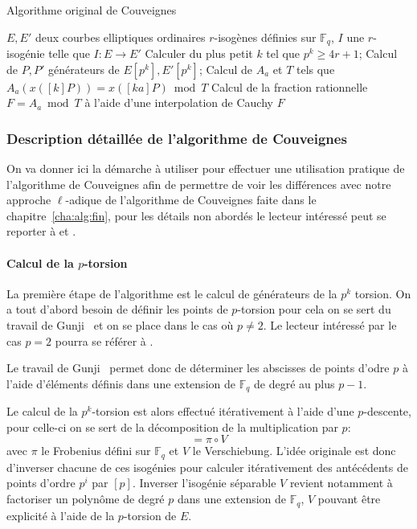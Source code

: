 \documentclass[10pt,a4paper]{book}
\theoremstyle{plain}
\theoremstyle{definition}
\theoremstyle{definition}
\theoremstyle{definition}
\theoremstyle{definition}
\theoremstyle{definition}
\theoremstyle{remark}
\theoremstyle{remark}
\theoremstyle{definition}
\begin{document}
\begin{algorithm}
\caption{\label{alg:orig:Couv} Algorithme original de Couveignes}
\begin{algorithmic}[1]
\REQUIRE $E,E'$ deux courbes elliptiques ordinaires $r$-isogènes définies sur $\mathbb{F}_q$,%
\ENSURE $I$ une $r$-isogénie telle que $I:E \rightarrow E'$
\STATE Calculer du plus petit $k$ tel que $p^k \geqslant 4r+1$;
\STATE Calcul de $P,P'$ générateurs de $E[p^k],E'[p^k]$;
\STATE Calcul de $A_a$ et $T$ tels que $A_a(x([k]P))=x([ka]P) \bmod T$
\STATE Calcul de la fraction rationnelle $F=A_a \bmod T$ à l'aide d'une 
interpolation de Cauchy
\RETURN $F$
\ENDIF
\ENDFOR
\end{algorithmic}
\end{algorithm}

\subsubsection{Description détaillée de l'algorithme de Couveignes }
On va donner ici la démarche à utiliser pour effectuer une utilisation 
pratique de l'algorithme de Couveignes afin de permettre de voir les différences
avec notre approche $\ell$-adique de l'algorithme de Couveignes faite dans le
chapitre~\ref{cha:alg:fin}, pour les détails non abordés le lecteur intéressé 
peut se reporter à \cite{Couveignes96} et \cite{DeFeo11}.

\paragraph{Calcul de la $p$-torsion}
La première étape de l'algorithme est le calcul de générateurs de la $p^k$ 
torsion. On a tout d'abord besoin de définir les points de $p$-torsion pour 
cela on se sert du travail de Gunji~\cite{Gunji76} et on se place dans le cas 
où $p \neq 2$. Le lecteur intéressé par le cas $p=2$ pourra se référer à 
\cite[§3.2]{DeFeo11}.

Le travail de Gunji~\cite[Theorem 4]{Gunji76} permet donc de déterminer les 
abscisses de points d'odre $p$ à l'aide d'éléments définis dans une extension 
de $\mathbb{F}_q$ de degré au plus $p-1$.  

Le calcul de la $p^k$-torsion est alors effectué itérativement à l'aide d'une 
$p$-descente, pour celle-ci on se sert de la décomposition de la multiplication
par $p$: 
\begin{equation}
[p]=\pi \circ V
\end{equation}
avec $\pi$ le Frobenius défini sur $\mathbb{F}_q$ et $V$ le Verschiebung. 
L'idée originale est donc d'inverser chacune  de ces isogénies pour calculer 
itérativement des antécédents de points d'ordre $p^i$ par $[p]$. Inverser 
l'isogénie séparable $V$ revient notamment à factoriser un polynôme de degré 
$p$ dans une extension de $\mathbb{F}_q$, $V$ pouvant être explicité à l'aide 
de la $p$-torsion de $E$. 
\end{document}
